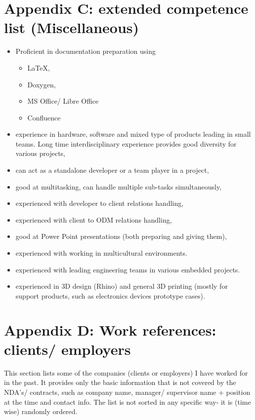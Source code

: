 \documentclass{tccv}
\begin{document}
\clearpage

\section{Appendix C: extended competence list (Miscellaneous)}

\begin{itemize}
	\item Proficient in documentation preparation using 
	\begin{itemize}
		\item \LaTeX, 
		\item Doxygen,
		\item MS Office/ Libre Office
		\item Confluence
	\end{itemize}
	\item experience in hardware, software and mixed type of products leading in small teams. Long time interdisciplinary experience provides good diversity for various projects,
	\item can act as a standalone developer or a team player in a project,
	\item good at multitasking, can handle multiple sub-tasks simultaneously,
	\item experienced with developer to client relations handling,
	\item experienced with client to ODM relations handling,
	\item good at Power Point presentations (both preparing and giving them),
	\item experienced with working in multicultural environments.
	\item experienced with leading engineering teams in various embedded projects.
	\item experienced in 3D design (Rhino) and general 3D printing (mostly for support products, such as electronics devices prototype cases).
	 
\end{itemize}

\clearpage

\section{Appendix D: Work references: clients/ employers}
\label{sec:clients}

This section lists some of the companies (clients or employers) I have worked for in the past. It provides only the basic information that is not covered by the NDA's/ contracts, such as company name, manager/ supervisor name + position at the time and contact info. The list is not sorted in any specific way- it is (time wise) randomly ordered. \\
\end{document}
